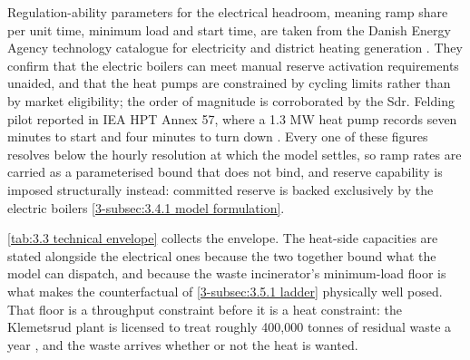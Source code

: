 Regulation-ability parameters for the electrical headroom, meaning ramp share per unit time, minimum load and start time, are taken from the Danish Energy Agency technology catalogue for electricity and district heating generation \cite{danish_energy_agency_technology_2024}. They confirm that the electric boilers can meet manual reserve activation requirements unaided, and that the heat pumps are constrained by cycling limits rather than by market eligibility; the order of magnitude is corroborated by the Sdr. Felding pilot reported in IEA HPT Annex 57, where a 1.3 MW heat pump records seven minutes to start and four minutes to turn down \cite{v_pedersen_annex_2024}. Every one of these figures resolves below the hourly resolution at which the model settles, so ramp rates are carried as a parameterised bound that does not bind, and reserve capability is imposed structurally instead: committed reserve is backed exclusively by the electric boilers \autoref{3-subsec:3.4.1 model formulation}.

\autoref{tab:3.3 technical envelope} collects the envelope. The heat-side capacities are stated alongside the electrical ones because the two together bound what the model can dispatch, and because the waste incinerator's minimum-load floor is what makes the counterfactual of \autoref{3-subsec:3.5.1 ladder} physically well posed. That floor is a throughput constraint before it is a heat constraint: the Klemetsrud plant is licensed to treat roughly 400{,}000 tonnes of residual waste a year \cite{dsbno_bygging_2026}, and the waste arrives whether or not the heat is wanted.

